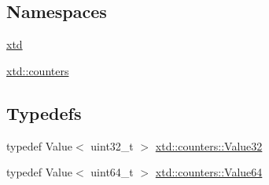 \subsection*{Namespaces}
\begin{DoxyCompactItemize}
\item 
\hyperlink{namespacextd}{xtd}
\item 
\hyperlink{namespacextd_1_1counters}{xtd\-::counters}
\end{DoxyCompactItemize}
\subsection*{Typedefs}
\begin{DoxyCompactItemize}
\item 
typedef Value$<$ uint32\-\_\-t $>$ \hyperlink{namespacextd_1_1counters_ad10dfbcb762ad7dfc7199ab5a268bc6e}{xtd\-::counters\-::\-Value32}
\item 
typedef Value$<$ uint64\-\_\-t $>$ \hyperlink{namespacextd_1_1counters_a20cdfbbbf5aa96abb1c5d461497d1769}{xtd\-::counters\-::\-Value64}
\end{DoxyCompactItemize}

